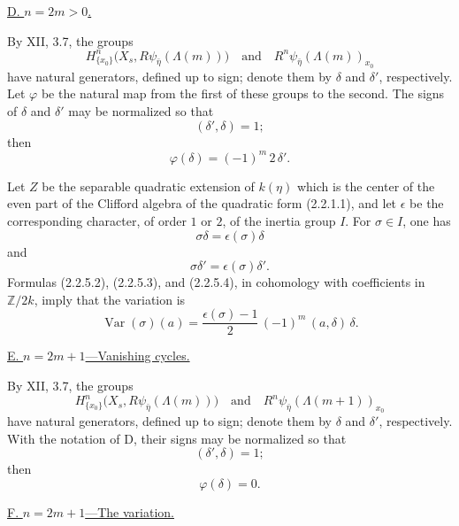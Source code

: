 \medskip
\noindent\underline{D. $n=2m>0$.}

By XII, 3.7, the groups
\[
H^n_{\{x_0\}}\bigl(X_s,R\psi_{\bar\eta}(\Lambda(m))\bigr)
\quad\text{and}\quad
R^n\psi_{\bar\eta}(\Lambda(m))_{x_0}
\]
have natural generators, defined up to sign; denote them by
$\delta$ and $\delta'$, respectively.  Let $\varphi$ be the natural map
from the first of these groups to the second.  The signs of $\delta$
and $\delta'$ may be normalized so that
\begin{equation}\tag{2.2.5.2}
(\delta',\delta)=1;
\end{equation}
then
\begin{equation}\tag{2.2.5.3}
\varphi(\delta)=(-1)^m\,2\,\delta'.
\end{equation}

Let $Z$ be the separable quadratic extension of $k(\eta)$ which is
the center of the even part of the Clifford algebra of the quadratic
form (2.2.1.1), and let $\epsilon$ be the corresponding character,
of order $1$ or $2$, of the inertia group $I$.  For $\sigma\in I$,
one has
\begin{equation}\tag{2.2.5.4}
\sigma\delta=\epsilon(\sigma)\delta
\end{equation}
and
\begin{equation}\tag{2.2.5.5}
\sigma\delta'=\epsilon(\sigma)\delta'.
\end{equation}
Formulas (2.2.5.2), (2.2.5.3), and (2.2.5.4), in cohomology with
coefficients in $\mathbb Z/2k$, imply that the variation is
\begin{equation}\tag{2.2.5.6}
\operatorname{Var}(\sigma)(a)=
\frac{\epsilon(\sigma)-1}{2}\,(-1)^m\,(a,\delta)\,\delta.
\end{equation}

\medskip
\noindent\underline{E. $n=2m+1$---Vanishing cycles.}

By XII, 3.7, the groups
\[
H^n_{\{x_0\}}\bigl(X_s,R\psi_{\bar\eta}(\Lambda(m))\bigr)
\quad\text{and}\quad
R^n\psi_{\bar\eta}(\Lambda(m+1))_{x_0}
\]
have natural generators, defined up to sign; denote them by
$\delta$ and $\delta'$, respectively.  With the notation of D, their
signs may be normalized so that
\begin{equation}\tag{2.2.5.7}
(\delta',\delta)=1;
\end{equation}
then
\begin{equation}\tag{2.2.5.8}
\varphi(\delta)=0.
\end{equation}

\medskip
\noindent\underline{F. $n=2m+1$---The variation.}

